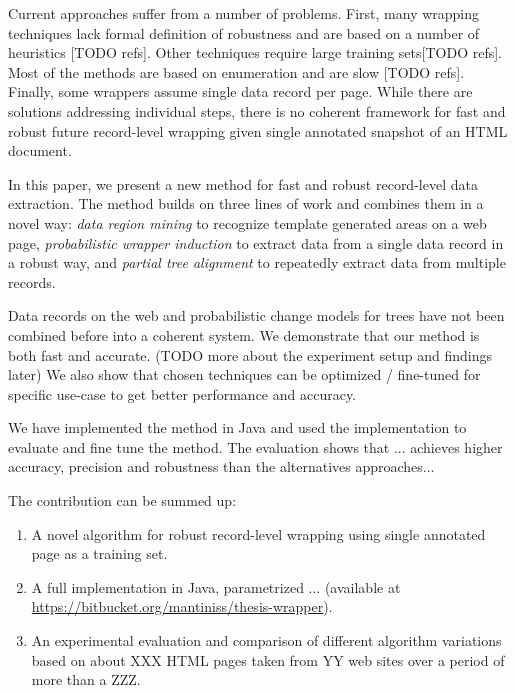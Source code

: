 
Current approaches suffer from a number of problems. First, many wrapping techniques lack formal definition of robustness and are based on a number of heuristics [TODO refs]. Other techniques require large training sets[TODO refs]. Most of the methods are based on enumeration and are slow [TODO refs]. Finally, some wrappers assume single data record per page. While there are solutions addressing individual steps, there is no coherent framework for fast and robust future record-level wrapping given single annotated snapshot of an HTML document.

In this paper, we present a new method for fast and robust record-level data extraction. The method builds on three lines of work and combines them in a novel way: \emph{data region mining} \cite{liu2009a} to recognize template generated areas on a web page, \emph{probabilistic wrapper induction} \cite{DBLP:journals/pvldb/ParameswaranDGR11} to extract data from a single data record in a robust way, and \emph{partial tree alignment} \cite{zhai2005a} to repeatedly extract data from multiple records. 

Data records on the web and probabilistic change models for trees have not been combined before into a coherent system. We demonstrate that our method is both fast and accurate. (TODO more about the experiment setup and findings later) We also show that chosen techniques can be optimized / fine-tuned for specific use-case to get better performance and accuracy.

We have implemented the method in Java and used the implementation to evaluate and fine tune the method. The evaluation shows that ... achieves higher accuracy, precision and robustness than the alternatives approaches...

The contribution can be summed up:

\begin{enumerate}
	\item A novel algorithm for robust record-level wrapping using single annotated page as a training set.
	\item A full implementation in Java, parametrized ... (available at \url{https://bitbucket.org/mantiniss/thesis-wrapper}).
	\item An experimental evaluation and comparison of different algorithm variations based on about XXX HTML pages taken from YY web sites over a period of more than a ZZZ.
\end{enumerate}

